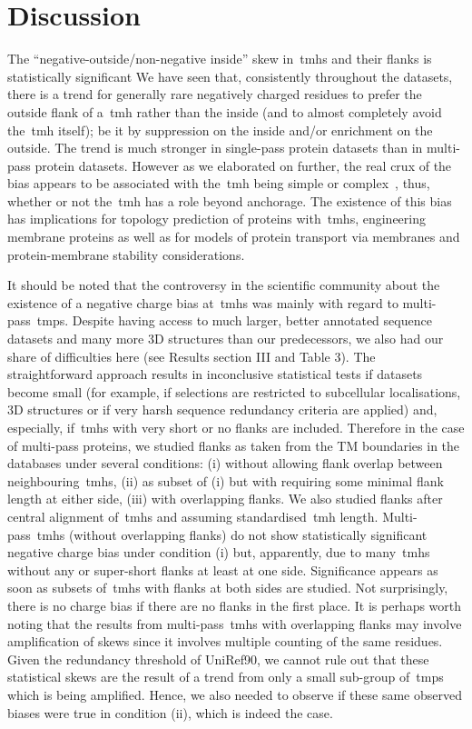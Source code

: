 \section{Discussion}

The ``negative-outside/non-negative inside'' skew in~\gls{tmh}s and their flanks is statistically significant
We have seen that, consistently throughout the datasets, there is a trend for generally rare negatively charged residues to prefer the outside flank of a~\gls{tmh} rather than the inside (and to almost completely avoid the~\gls{tmh} itself); be it by suppression on the inside and/or enrichment on the outside.
The trend is much stronger in single-pass protein datasets than in multi-pass protein datasets.
However as we elaborated on further, the real crux of the bias appears to be associated with the~\gls{tmh} being simple or complex~\cite{Wong2011, Wong2012}, thus, whether or not the~\gls{tmh} has a role beyond anchorage.
The existence of this bias has implications for topology prediction of proteins with~\gls{tmh}s, engineering membrane proteins as well as for models of protein transport via membranes and protein-membrane stability considerations.

It should be noted that the controversy in the scientific community about the existence of a negative charge bias at~\gls{tmh}s was mainly with regard to multi-pass~\gls{tmp}s.
Despite having access to much larger, better annotated sequence datasets and many more 3D structures than our predecessors, we also had our share of difficulties here (see Results section III and Table 3).
The straightforward approach results in inconclusive statistical tests if datasets become small (for example, if selections are restricted to subcellular localisations, 3D structures or if very harsh sequence redundancy criteria are applied) and, especially, if~\gls{tmh}s with very short or no flanks are included.
Therefore in the case of multi-pass proteins, we studied flanks as taken from the TM boundaries in the databases under several conditions: (i) without allowing flank overlap between neighbouring~\gls{tmh}s, (ii) as subset of (i) but with requiring some minimal flank length at either side, (iii) with overlapping flanks.
We also studied flanks after central alignment of~\gls{tmh}s and assuming standardised~\gls{tmh} length.
Multi-pass~\gls{tmh}s (without overlapping flanks) do not show statistically significant negative charge bias under condition (i) but, apparently, due to many~\gls{tmh}s without any or super-short flanks at least at one side.
Significance appears as soon as subsets of~\gls{tmh}s with flanks at both sides are studied.
Not surprisingly, there is no charge bias if there are no flanks in the first place.
It is perhaps worth noting that the results from multi-pass~\gls{tmh}s with overlapping flanks may involve amplification of skews since it involves multiple counting of the same residues.
Given the redundancy threshold of UniRef90, we cannot rule out that these statistical skews are the result of a trend from only a small sub-group of~\gls{tmp}s which is being amplified.
Hence, we also needed to observe if these same observed biases were true in condition (ii), which is indeed the case.


